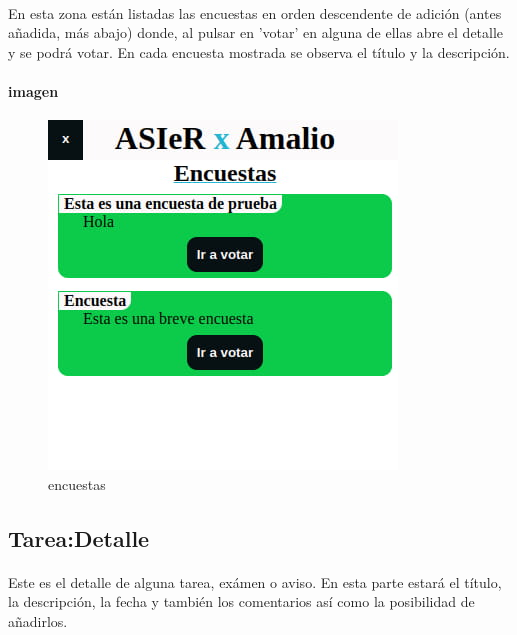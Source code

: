 \documentclass[a4paper]{article}
\begin{document}
 \paragraph{}
 En esta zona están listadas las encuestas en orden descendente de adición 
 (antes añadida, más abajo) donde, al pulsar en 'votar' en alguna de ellas
 abre el detalle y se podrá votar. En cada encuesta mostrada se observa el 
 título y la descripción.
 \paragraph{imagen}
 \begin{figure}[ht]
    \includegraphics[scale=0.5]{./assets/encuestas.jpg}
    \centering
    \caption{encuestas}
    \label{fig:encuestas}
 \end{figure}
 \newpage
 \subsection[/app/tarea/id]{Tarea:Detalle}
 \paragraph{}
Este es el detalle de alguna tarea, exámen o aviso. En esta parte estará el título, 
la descripción, la fecha y también los comentarios así como la posibilidad de añadirlos.
\end{document}
